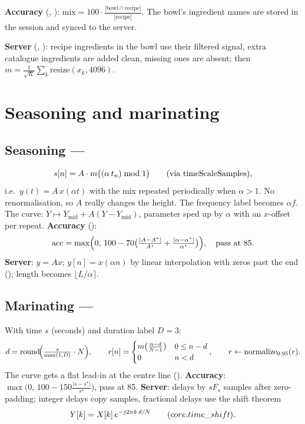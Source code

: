 \documentclass[11pt,a4paper]{article}
\begin{document}
\textbf{Accuracy} (, ):
$\text{mix}=100\cdot\frac{|\text{bowl}\cap\text{recipe}|}{|\text{recipe}|}$. The bowl's
ingredient names are stored in the session and synced to the server.

\textbf{Server} (, ): recipe ingredients in the bowl use their
filtered signal, extra catalogue ingredients are added clean, missing ones are absent; then
$m=\frac{1}{\sqrt K}\sum_k \text{resize}(x_k,4096)$.

\section{Seasoning and marinating}
\subsection{Seasoning --- }
\[
s[n]=A\cdot m\bigl((\alpha\,t_n)\bmod 1\bigr)\qquad(\text{via \fn{timeScaleSamples}}),
\]
i.e.\ $y(t)=A\,x(\alpha t)$ with the mix repeated periodically when $\alpha>1$. No
renormalisation, so $A$ really changes the height. The frequency label becomes $\alpha f$.
The curve: $Y\mapsto Y_{\text{mid}}+A(Y-Y_{\text{mid}})$, parameter sped up by $\alpha$ with an
$x$-offset per repeat. \textbf{Accuracy} ():
\[
\text{acc}=\max\Bigl(0,\,100-70\bigl(\tfrac{|A-A^\star|}{A^\star}+\tfrac{|\alpha-\alpha^\star|}{\alpha^\star}\bigr)\Bigr),
\quad\text{pass at }85.
\]
\textbf{Server}:  $y=A x$;  $y[n]=x(\alpha n)$ by linear
interpolation with zeros past the end (); length becomes $\lfloor L/\alpha\rceil$.

\subsection{Marinating --- }
With time $s$ (seconds) and duration label $D=3$:
\[
d=\operatorname{round}\!\Bigl(\tfrac{s}{\max(1,D)}\cdot N\Bigr),\qquad
r[n]=\begin{cases}m\bigl(\tfrac{n-d}{N-1}\bigr) & 0\le n-d\\ 0 & n<d\end{cases},
\qquad r\leftarrow\text{normalize}_{0.95}(r).
\]
The curve gets a flat lead-in at the centre line ().
\textbf{Accuracy}: $\max\bigl(0,\,100-150\tfrac{|s-s^\star|}{s^\star}\bigr)$, pass at 85.
\textbf{Server}:  delays by $sF_s$ samples after zero-padding; integer
delays copy samples, fractional delays use the shift theorem
\[
Y[k]=X[k]\,e^{-j2\pi k\,d/N}\qquad(\fn{core.time_shift}).
\]
\end{document}
